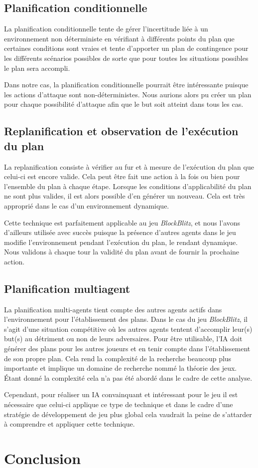 \documentclass[12pt,english,frenchb,letterpaper]{article}
\begin{document}
\subsection{Planification conditionnelle}
La planification conditionnelle tente de gérer l'incertitude liée à un environnement non déterministe en vérifiant à différents points du plan que certaines conditions sont vraies et tente d'apporter un plan de contingence pour les différents scénarios possibles de sorte que pour toutes les situations possibles le plan sera accompli.

Dans notre cas, la planification conditionnelle pourrait être intéressante puisque les actions d'attaque sont non-déterministes. Nous aurions alors pu créer un plan pour chaque possibilité d'attaque afin que le but soit atteint dans tous les cas.

\subsection{Replanification et observation de l'exécution du plan}
La replanification consiste à vérifier au fur et à mesure de l'exécution du plan que celui-ci est encore valide.  Cela peut être fait une action à la fois ou bien pour l'ensemble du plan à chaque étape.  Lorsque les conditions d'applicabilité du plan ne sont plus valides, il est alors possible d'en générer un nouveau. Cela est très approprié dans le cas d'un environnement dynamique.

Cette technique est parfaitement applicable au jeu \textit{BlockBlitz}, et nous l'avons d'ailleurs utilisée avec succès puisque la présence d'autres agents dans le jeu modifie l'environnement pendant l'exécution du plan, le rendant dynamique.  Nous validons à chaque tour la validité du plan avant de fournir la prochaine action.

\subsection{Planification multiagent}

La planification multi-agents tient compte des autres agents actifs dans l'environnement pour l'établissement des plans.  Dans le cas du jeu \textit{BlockBlitz}, il s'agit d'une situation compétitive où les autres agents tentent d'accomplir leur(s) but(s) au détriment ou non de leurs adversaires.  Pour être utilisable, l'IA doit générer des plans pour les autres joueurs et en tenir compte dans l'établissement de son propre plan.  Cela rend la complexité de la recherche beaucoup plus importante et implique un domaine de recherche nommé la théorie des jeux.  Étant donné la complexité cela n'a pas été abordé dans le cadre de cette analyse.  

Cependant, pour réaliser un IA convainquant et intéressant pour le jeu il est nécessaire que celui-ci applique ce type de technique et dans le cadre d'une stratégie de développement de jeu plus global cela vaudrait la peine de s'attarder à comprendre et appliquer cette technique.


\section{Conclusion}
\end{document}
